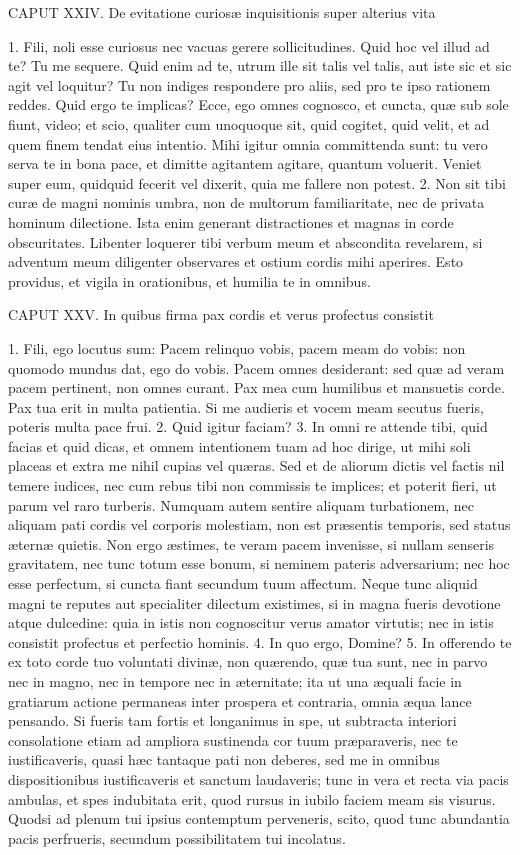 \documentclass[twoside]{article}
\begin{document}
CAPUT XXIV.
De evitatione curiosæ inquisitionis super alterius vita

1. Fili, noli esse curiosus nec vacuas gerere sollicitudines. Quid hoc vel illud ad te? Tu me sequere. Quid enim ad te, utrum ille sit talis vel talis, aut iste sic et sic agit vel loquitur? Tu non indiges respondere pro aliis, sed pro te ipso rationem reddes. Quid ergo te implicas? Ecce, ego omnes cognosco, et cuncta, quæ sub sole fiunt, video; et scio, qualiter cum unoquoque sit, quid cogitet, quid velit, et ad quem finem tendat eius intentio. Mihi igitur omnia committenda sunt: tu vero serva te in bona pace, et dimitte agitantem agitare, quantum voluerit. Veniet super eum, quidquid fecerit vel dixerit, quia me fallere non potest.
2. Non sit tibi curæ de magni nominis umbra, non de multorum familiaritate, nec de privata hominum dilectione. Ista enim generant distractiones et magnas in corde obscuritates. Libenter loquerer tibi verbum meum et abscondita revelarem, si adventum meum diligenter observares et ostium cordis mihi aperires. Esto providus, et vigila in orationibus, et humilia te in omnibus.


CAPUT XXV.
In quibus firma pax cordis et verus profectus consistit

1. Fili, ego locutus sum: Pacem relinquo vobis, pacem meam do vobis: non quomodo mundus dat, ego do vobis. Pacem omnes desiderant: sed quæ ad veram pacem pertinent, non omnes curant. Pax mea cum humilibus et mansuetis corde. Pax tua erit in multa patientia. Si me audieris et vocem meam secutus fueris, poteris multa pace frui.
2. Quid igitur faciam?
3. In omni re attende tibi, quid facias et quid dicas, et omnem intentionem tuam ad hoc dirige, ut mihi soli placeas et extra me nihil cupias vel quæras. Sed et de aliorum dictis vel factis nil temere iudices, nec cum rebus tibi non commissis te implices; et poterit fieri, ut parum vel raro turberis. Numquam autem sentire aliquam turbationem, nec aliquam pati cordis vel corporis molestiam, non est præsentis temporis, sed status æternæ quietis. Non ergo æstimes, te veram pacem invenisse, si nullam senseris gravitatem, nec tunc totum esse bonum, si neminem pateris adversarium; nec hoc esse perfectum, si cuncta fiant secundum tuum affectum. Neque tunc aliquid magni te reputes aut specialiter dilectum existimes, si in magna fueris devotione atque dulcedine: quia in istis non cognoscitur verus amator virtutis; nec in istis consistit profectus et perfectio hominis.
4. In quo ergo, Domine?
5. In offerendo te ex toto corde tuo voluntati divinæ, non quærendo, quæ tua sunt, nec in parvo nec in magno, nec in tempore nec in æternitate; ita ut una æquali facie in gratiarum actione permaneas inter prospera et contraria, omnia æqua lance pensando. Si fueris tam fortis et longanimus in spe, ut subtracta interiori consolatione etiam ad ampliora sustinenda cor tuum præparaveris, nec te iustificaveris, quasi hæc tantaque pati non deberes, sed me in omnibus dispositionibus iustificaveris et sanctum laudaveris; tunc in vera et recta via pacis ambulas, et spes indubitata erit, quod rursus in iubilo faciem meam sis visurus. Quodsi ad plenum tui ipsius contemptum perveneris, scito, quod tunc abundantia pacis perfrueris, secundum possibilitatem tui incolatus.
\end{document}

